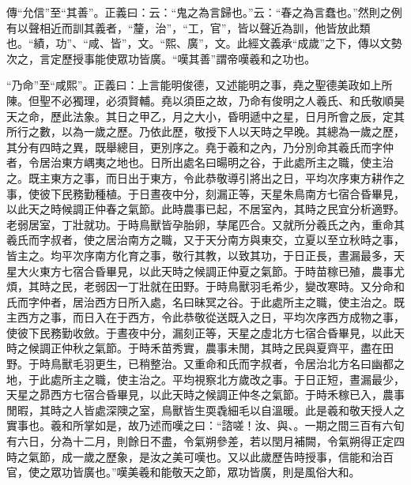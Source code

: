 {\noindent\zhuan{}\fzbyks 傳“允信”至“其善”。正義曰：云：“鬼之為言歸也。”云：“春之為言蠢也。”然則之例有以聲相近而訓其義者，“釐，治”，“工，官”，皆以聲近為訓，他皆放此類也。“績，功”、“咸、皆”，文。“熙、廣”，文。此經文義承“成歲”之下，傳以文勢次之，言定歷授事能使眾功皆廣。“嘆其善”謂帝嘆羲和之功也。 \par}

{\noindent\shu{}\fzkt “乃命”至“咸熙”。正義曰：上言能明俊德，又述能明之事，堯之聖德美政如上所陳。但聖不必獨理，必須賢輔。堯以須臣之故，乃命有俊明之人羲氏、和氏敬順昊天之命，歷此法象。其日之甲乙，月之大小，昏明遞中之星，日月所會之辰，定其所行之數，以為一歲之歷。乃依此歷，敬授下人以天時之早晚。其總為一歲之歷，其分有四時之異，既舉總目，更別序之。堯于羲和之內，乃分別命其羲氏而字仲者，令居治東方嵎夷之地也。日所出處名曰暘明之谷，于此處所主之職，使主治之。既主東方之事，而日出于東方，令此恭敬導引將出之日，平均次序東方耕作之事，使彼下民務勤種植。于日晝夜中分，刻漏正等，天星朱鳥南方七宿合昏畢見，以此天之時候調正仲春之氣節。此時農事已起，不居室內，其時之民宜分析適野。老弱居室，丁壯就功。于時鳥獸皆孕胎卵，孳尾匹合。又就所分羲氏之內，重命其羲氏而字叔者，使之居治南方之職，又于天分南方與東交，立夏以至立秋時之事，皆主之。均平次序南方化育之事，敬行其教，以致其功，于日正長，晝漏最多，天星大火東方七宿合昏畢見，以此天時之候調正仲夏之氣節。于時苗稼已殖，農事尤煩，其時之民，老弱因一丁壯就在田野。于時鳥獸羽毛希少，變改寒時。又分命和氏而字仲者，居治西方日所入處，名曰昧冥之谷。于此處所主之職，使主治之。既主西方之事，而日入在于西方，令此恭敬從送既入之日，平均次序西方成物之事，使彼下民務勤收斂。于晝夜中分，漏刻正等，天星之虛北方七宿合昏畢見，以此天時之候調正仲秋之氣節。于時禾苗秀實，農事未閒，其時之民與夏齊平，盡在田野。于時鳥獸毛羽更生，已稍整治。又重命和氏而字叔者，令居治北方名曰幽都之地，于此處所主之職，使主治之。平均視察北方歲改之事。于日正短，晝漏最少，天星之昴西方七宿合昏畢見，以此天時之候調正仲冬之氣節。于時禾稼已入，農事閒暇，其時之人皆處深隩之室，鳥獸皆生耎毳細毛以自溫暖。此是羲和敬天授人之實事也。羲和所掌如是，故乃述而嘆之曰：“諮嗟！汝、與、。一期之間三百有六旬有六日，分為十二月，則餘日不盡，令氣朔參差，若以閏月補闕，令氣朔得正定四時之氣節，成一歲之歷象，是汝之美可嘆也。又以此歲歷告時授事，信能和治百官，使之眾功皆廣也。”嘆美羲和能敬天之節，眾功皆廣，則是風俗大和。 \par}

